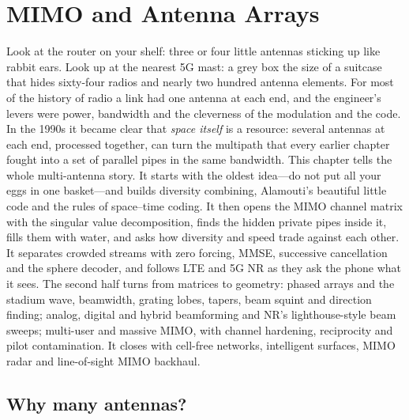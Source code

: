 \chapter{MIMO and Antenna Arrays}
\label{ch:mimo}

\begin{chapterintro}
Look at the router on your shelf: three or four little antennas sticking up like rabbit ears. Look
up at the nearest 5G mast: a grey box the size of a suitcase that hides sixty-four radios and nearly
two hundred antenna elements. For most of the history of radio a link had one antenna at each end,
and the engineer's levers were power, bandwidth and the cleverness of the modulation and the code.
In the 1990s it became clear that \emph{space itself} is a resource: several antennas at each end,
processed together, can turn the multipath that every earlier chapter fought into a set of parallel
pipes in the same bandwidth. This chapter tells the whole multi-antenna story. It starts with the
oldest idea---do not put all your eggs in one basket---and builds diversity combining, Alamouti's
beautiful little code and the rules of space--time coding. It then opens the MIMO channel matrix
with the singular value decomposition, finds the hidden private pipes inside it, fills them with
water, and asks how diversity and speed trade against each other. It separates crowded streams with
zero forcing, MMSE, successive cancellation and the sphere decoder, and follows LTE and 5G NR as they
ask the phone what it sees. The second half turns from matrices to geometry: phased arrays and the
stadium wave, beamwidth, grating lobes, tapers, beam squint and direction finding; analog, digital
and hybrid beamforming and NR's lighthouse-style beam sweeps; multi-user and massive MIMO, with
channel hardening, reciprocity and pilot contamination. It closes with cell-free networks,
intelligent surfaces, MIMO radar and line-of-sight MIMO backhaul.
\end{chapterintro}


\section{Why many antennas?}
\label{sec:ch19:why}

